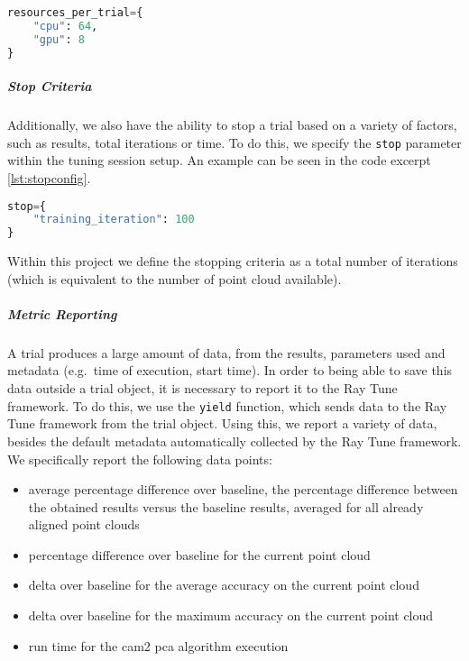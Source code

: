 \begin{lstlisting}[language=Python, caption=Example resource allocation configuration, captionpos=b, label={lst:resconfig}]
resources_per_trial={
    "cpu": 64, 
    "gpu": 8
}
\end{lstlisting}

\subparagraph{Stop Criteria}

Additionally, we also have the ability to stop a trial based on a variety of factors, such as results, total iterations or time. To do this, we specify the \verb!stop! parameter within the tuning session setup. An example can be seen in the code excerpt \ref{lst:stopconfig}.

\begin{lstlisting}[language=Python, caption=Example stopping criteria configuration, captionpos=b, label={lst:stopconfig}]
stop={
    "training_iteration": 100
}
\end{lstlisting}

Within this project we define the stopping criteria as a total number of iterations (which is equivalent to the number of point cloud available).

\subparagraph{Metric Reporting}

A trial produces a large amount of data, from the results, parameters used and metadata (e.g.\ time of execution, start time). In order to being able to save this data outside a trial object, it is necessary to report it to the Ray Tune framework. To do this, we use the \verb!yield! function, which sends data to the Ray Tune framework from the trial object. Using this, we report a variety of data, besides the default metadata automatically collected by the Ray Tune framework. We specifically report the following data points:

\begin{itemize}
    \item average percentage difference over baseline, the percentage difference between the obtained results versus the baseline results, averaged for all already aligned point clouds
    \item percentage difference over baseline for the current point cloud
    \item delta over baseline for the average accuracy on the current point cloud
    \item delta over baseline for the maximum accuracy on the current point cloud
    \item run time for the \acrshort{cam2} \acrshort{pca} algorithm execution
\end{itemize}

